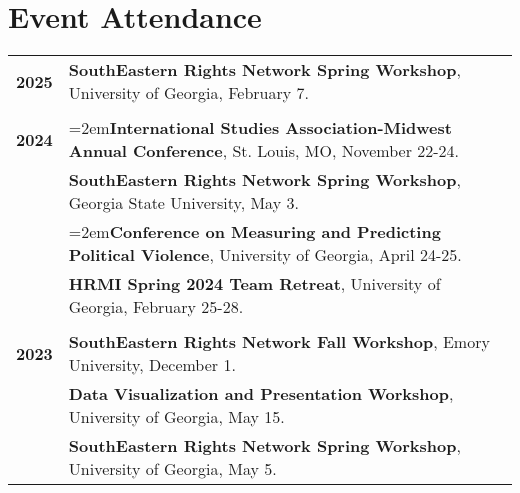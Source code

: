 \documentclass[letterpaper,12pt]{article}
\begin{document}
\section{Event Attendance}
\begin{xltabular}{\dimexpr\textwidth-0in}{p{.85in}X}
\textbf{2025} & \textbf{SouthEastern Rights Network Spring Workshop}, University of Georgia, February 7.\\ \\
\textbf{2024} & \hangindent=2em\textbf{International Studies Association-Midwest Annual Conference}, St. Louis, MO, November 22-24.\\
                     &  \textbf{SouthEastern Rights Network Spring Workshop}, Georgia State University, May 3.\\
                     &  \hangindent=2em\textbf{Conference on Measuring and Predicting Political Violence}, University of Georgia, April 24-25.\\
                     &  \textbf{HRMI Spring 2024 Team Retreat}, University of Georgia, February 25-28.\\ \\
\textbf{2023} &  \textbf{SouthEastern Rights Network Fall Workshop}, Emory University, December 1.\\
                     &  \textbf{Data Visualization and Presentation Workshop}, University of Georgia, May 15.\\
                     &  \textbf{SouthEastern Rights Network Spring Workshop}, University of Georgia, May 5.
\end{xltabular}

\end{document}
